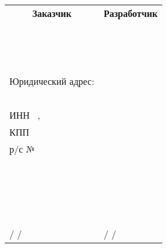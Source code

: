 \documentclass[12pt]{article}
\begin{document}
\begin{table}[h]
    \begin{tabular}{p{8cm}p{8cm}}
    \multicolumn{1}{c}{\bf Заказчик} & \multicolumn{1}{c}{\bf Разработчик} \\
    ~ & ~ \\
    ~ & 
    ~ \\
    ~ & ~ \\
    Юридический адрес: & ~ \\
    ~ \\
    ИНН ~,\\
    КПП ~ \\
    р/с № ~ & 
    ~ \\
    ~ & ~ \\
    ~ & 
    ~ \\
    ~ & ~ \\
    ~ & ~ \\
    \underline{\hspace{4cm}} /  / & \underline{\hspace{4cm}} /  / \\
    \end{tabular}
\end{table}
\end{document}
